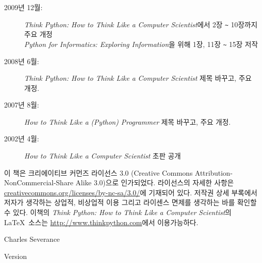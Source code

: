 \begin{latexonly}
{\begin{description}
\item[2009년 12월:] \emph{Think Python: How to Think Like a Computer Scientist}에서 2장 {\verb"~"} 10장까지 주요 개정 \\
\emph{Python for Informatics: Exploring Information}을 위해 1장, 11장 {\verb"~"} 15장 저작

\item[2008년 6월:] \emph{Think Python: How to Think Like a Computer Scientist} 제목 바꾸고, 주요 개정.

\item[2007년 8월:] \emph{How to Think Like a (Python) Programmer} 제목 바꾸고, 주요 개정.

\item[2002년 4월:] \emph{How to Think Like a Computer Scientist} 초판 공개

\end{description}

\vspace{0.2in}

이 책은 크리에이티브 커먼즈 라이선스 3.0 (Creative Commons Attribution-NonCommercial-Share Alike 3.0)으로 인가되었다.
라이선스의 자세한 사항은 \url{creativecommons.org/licenses/by-nc-sa/3.0/}에 기재되어 있다.
저작권 상세 부록에서 저자가 생각하는 상업적, 비상업적 이용 그리고 라이센스 면제를 생각하는 바를 확인할 수 있다.
이책의 \emph{Think Python: How to Think Like a Computer Scientist}의 \LaTeX\ 소스는 
\url{http://www.thinkpython.com}에서 이용가능하다.

\vspace{0.2in}

} %

\end{latexonly}



\begin{htmlonly}


{\Large \thetitle}

{\large 
Charles Severance}

Version \theversion

\setcounter{chapter}{-1}

\end{htmlonly}
